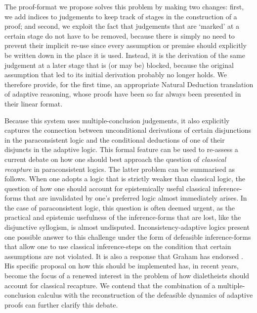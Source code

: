 \documentclass[]{article}
\begin{document}
The proof-format we propose solves this problem by making two changes: first, we add indices to judgements to keep track of stages in the construction of a proof; and second, we exploit the fact that judgements that are `marked' at a certain stage do not have to be removed, because there is simply no need to prevent their implicit re-use since every assumption or premise should explicitly be written down in the place it is used. Instead, it is the derivation of the same judgement at a later stage that is (or may be) blocked, because the original assumption that led to its initial derivation probably no longer holds. We therefore provide, for the first time, an appropriate Natural Deduction translation of adaptive reasoning, whose proofs have been so far always been presented in their linear format.

Because this system uses multiple-conclusion judgements, it also explicitly captures the connection between unconditional derivations of certain disjunctions in the paraconsistent logic and the conditional deductions of one of their disjuncts in the adaptive logic. This formal feature can be used to re-assess a current debate on how one should best approach the question of \textit{classical recapture} in paraconsistent logics. The latter problem can be summarised as follows. When one adopts a logic that is strictly weaker than classical logic, the question of how one should account for epistemically useful classical inference-forms that are invalidated by one's preferred logic almost immediately arises. In the case of paraconsistent logic, this question is often deemed urgent, as the practical and epistemic usefulness of the inference-forms that are lost, like the disjunctive syllogism, is almost undisputed. Inconsistency-adaptive logics present one possible answer to this challenge under the form of defeasible inference-forms that allow one to use classical inference-steps on the condition that certain assumptions are not violated. It is also a response that Graham has endorsed \cite{GP:LPm}. His specific proposal on how this should be implemented has, in recent years, become the focus of a renewed interest in the problem of how dialetheists should account for classical recapture. We contend that the combination of a multiple-conclusion calculus with the reconstruction of the defeasible dynamics of adaptive proofs can further clarify this debate.
\end{document}
